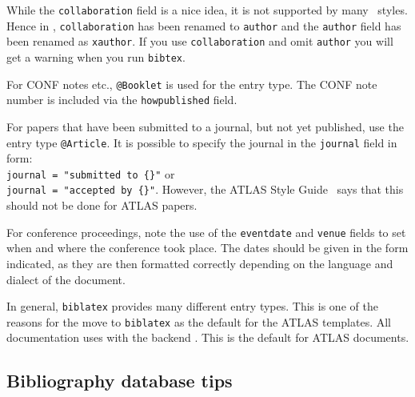 \documentclass[UKenglish, texlive=2016]{atlasdoc}
\begin{document}
While the \texttt{collaboration} field is a nice idea, it is not supported by many \BibTeX\ styles.
Hence in , \texttt{collaboration} has been renamed to \texttt{author} and
the \texttt{author} field has been renamed as \texttt{xauthor}. If you use \texttt{collaboration} and omit
\texttt{author} you will get a warning when you run \texttt{bibtex}.

For CONF notes etc., \texttt{@Booklet} is used for the entry type.
The CONF note number is included via the \texttt{howpublished} field.

For papers that have been submitted to a journal, but not yet published, use the entry type \texttt{@Article}.
It is possible to specify the journal in the \texttt{journal} field in form:\\
\texttt{journal = "submitted to \{\}"} or\\
\texttt{journal = "accepted by \{\}"}.
However, the ATLAS Style Guide~\cite{atlas-style} says that this should not be done for ATLAS papers.

For conference proceedings, note the use of the \texttt{eventdate} and \texttt{venue}
fields to set when and where the conference took place.
The dates should be given in the form indicated,
as they are then formatted correctly depending on the language and dialect of the document.

In general, \texttt{biblatex} provides many different entry types.
This is one of the reasons for the  move to \texttt{biblatex} as the default for the ATLAS templates.
All  documentation uses  with the backend .
 This is the default for ATLAS documents.


\subsection{Bibliography database tips}
\end{document}
